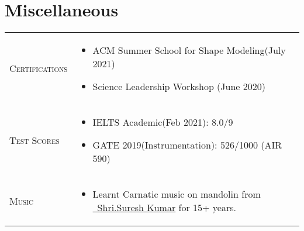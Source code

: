 \documentclass[a4paper,12pt]{article}
\begin{document}
\section{Miscellaneous}
\begin{tabularx}{\linewidth}{@{}l X@{}}
\textsc{Certifications} & \begin{itemize}
    \item ACM Summer School for Shape Modeling(July 2021)
    \item Science Leadership Workshop (June 2020)
\end{itemize}
\\
\textsc{Test Scores}  &  \begin{itemize}
    \item IELTS Academic(Feb 2021): 8.0/9
    \item GATE 2019(Instrumentation): 526/1000 (AIR 590)
\end{itemize}
\\  
\textsc{Music}&
    \begin{itemize}
    \item Learnt Carnatic music on mandolin from \href{https://www.linkedin.com/in/mandolin-suresh-kumar-410577151/?originalSubdomain=in}{\raisebox{-0.05\height}\ Shri.Suresh Kumar} for 15+ years.
\end{itemize}\\
\end{tabularx}
%
\end{document}
